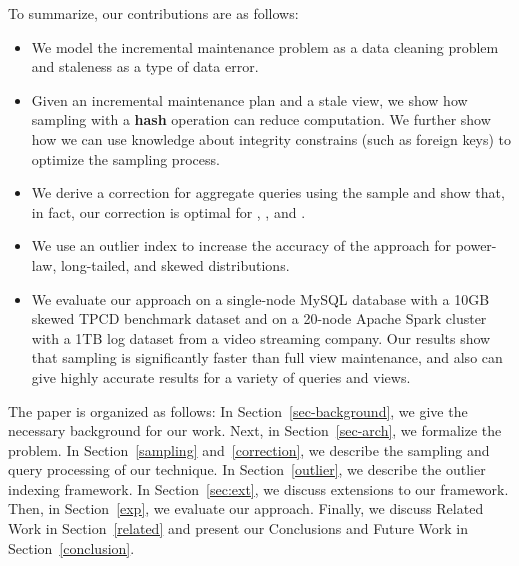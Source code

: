 To summarize, our contributions are as follows:
\begin{itemize}\vspace{-.45em}
\item We model the incremental maintenance problem as a data cleaning problem and staleness as a type of data error.\vspace{-.45em}
\item Given an incremental maintenance plan and a stale view, we show how sampling with a \textbf{hash} operation can reduce computation. We further show how we can use knowledge about integrity constrains (such as foreign keys) to optimize the sampling process. \vspace{-.45em}
\item We derive a correction for aggregate queries using the sample and show that, in fact, our correction is optimal for \sumfunc, \countfunc, and \avgfunc. \vspace{-.45em}
\item We use an outlier index to increase the accuracy of the approach for power-law, long-tailed, and skewed distributions.\vspace{-.45em}
\item We evaluate our approach on a single-node MySQL database with a 10GB skewed TPCD benchmark dataset and on a 20-node Apache Spark cluster with a 1TB log dataset from a video streaming company. Our results show that sampling is significantly faster than full view maintenance, and also can give highly accurate results for a variety of queries and views.\vspace{-.45em}
\end{itemize}

The paper is organized as follows: 
In Section~\ref{sec-background}, we give the necessary background for our work.
Next, in Section~\ref{sec-arch}, we formalize the problem.
In Section~\ref{sampling} and~\ref{correction}, we describe the sampling and query processing of our technique.
In Section~\ref{outlier}, we describe the outlier indexing framework.
In Section~\ref{sec:ext}, we discuss extensions to our framework.
Then, in Section~\ref{exp}, we evaluate our approach.
Finally, we discuss Related Work in Section~\ref{related} and present our Conclusions and Future Work in Section~\ref{conclusion}.
